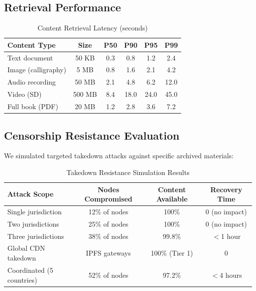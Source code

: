 \documentclass[11pt,a4paper]{article}
\begin{document}
\subsection{Retrieval Performance}

\begin{table}[H]
\centering
\caption{Content Retrieval Latency (seconds)}
\label{tab:retrieval}
\begin{tabular}{lccccc}
\toprule
\textbf{Content Type} & \textbf{Size} & \textbf{P50} & \textbf{P90} & \textbf{P95} & \textbf{P99} \\
\midrule
Text document & 50 KB & 0.3 & 0.8 & 1.2 & 2.4 \\
Image (calligraphy) & 5 MB & 0.8 & 1.6 & 2.1 & 4.2 \\
Audio recording & 50 MB & 2.1 & 4.8 & 6.2 & 12.0 \\
Video (SD) & 500 MB & 8.4 & 18.0 & 24.0 & 45.0 \\
Full book (PDF) & 20 MB & 1.2 & 2.8 & 3.6 & 7.2 \\
\bottomrule
\end{tabular}
\end{table}

\subsection{Censorship Resistance Evaluation}

We simulated targeted takedown attacks against specific archived materials:

\begin{table}[H]
\centering
\caption{Takedown Resistance Simulation Results}
\label{tab:takedown}
\begin{tabular}{lccc}
\toprule
\textbf{Attack Scope} & \textbf{Nodes Compromised} & \textbf{Content Available} & \textbf{Recovery Time} \\
\midrule
Single jurisdiction & 12\% of nodes & 100\% & 0 (no impact) \\
Two jurisdictions & 25\% of nodes & 100\% & 0 (no impact) \\
Three jurisdictions & 38\% of nodes & 99.8\% & $<$1 hour \\
Global CDN takedown & IPFS gateways & 100\% (Tier 1) & 0 \\
Coordinated (5 countries) & 52\% of nodes & 97.2\% & $<$4 hours \\
\bottomrule
\end{tabular}
\end{table}
\end{document}
